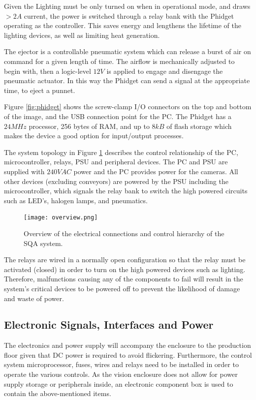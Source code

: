 \documentclass[fleqn,twoside,12pt]{report}
\begin{document}
Given the Lighting must be only turned on when in operational mode, and draws $>2A$ current, the power is switched through a relay bank with the Phidget operating as the controller. This saves energy and lengthens the lifetime of the lighting devices, as well as limiting heat generation.


The ejector is a controllable pneumatic system which can release a burst of air on command for a given length of time. The airflow is mechanically adjusted to begin with, then a logic-level $12V$ is applied to engage and disengage the pneumatic actuator. In this way the Phidget can send a signal at the appropriate time, to eject a punnet.


Figure \ref{fig:phidget} shows the screw-clamp I/O connectors on the top and bottom of the image, and the USB connection point for the PC. The Phidget has a $24MHz$ processor, 256 bytes of RAM, and up to $8kB$ of flash storage which makes the device a good option for input/output processes.
 


The system topology in Figure \ref{fig:overview} describes the control relationship of the PC, microcontroller, relays, PSU and peripheral devices. The PC and PSU are supplied with $240VAC$ power and the PC provides power for the cameras. All other devices (excluding conveyors) are powered by the PSU including the microcontroller, which signals the relay bank to switch the high powered circuits such as LED's, halogen lamps, and pneumatics. 


\begin{figure}[h]
	\centering
	\texttt{[image: overview.png]}
	\caption{Overview of the electrical connections and control hierarchy of the SQA system.}
	\label{fig:overview}
\end{figure} 

The relays are wired in a normally open configuration so that the relay must be activated (closed) in order to turn on the high powered devices such as lighting. Therefore, malfunctions causing any of the components to fail will result in the system's critical devices to be powered off to prevent the likelihood of damage and waste of power.


\subsection{Electronic Signals, Interfaces and Power}
\label{sec:electronic_power}

The electronics and power supply will accompany the enclosure to the production floor given that DC power is required to avoid flickering. Furthermore, the control system microprocessor, fuses, wires and relays need to be installed in order to operate the various controls. As the vision enclosure does not allow for power supply storage or peripherals inside, an electronic component box is used to contain the above-mentioned items. 
\end{document}
